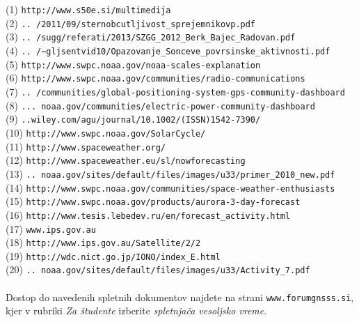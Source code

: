 (1)   \verb|http://www.s50e.si/multimedija| \\
(2)   \verb|.. /2011/09/sternobcutljivost_sprejemnikovp.pdf| \\
(3)   \verb|.. /sugg/referati/2013/SZGG_2012_Berk_Bajec_Radovan.pdf| \\
(4)   \verb|.. /~gljsentvid10/Opazovanje_Sonceve_povrsinske_aktivnosti.pdf| \\
(5)   \verb|http://www.swpc.noaa.gov/noaa-scales-explanation| \\   
(6)   \verb|http://www.swpc.noaa.gov/communities/radio-communications| \\   
(7)   \verb|.. /communities/global-positioning-system-gps-community-dashboard| \\   
(8)   \verb|... noaa.gov/communities/electric-power-community-dashboard|  \\ 
(9)   \verb|..wiley.com/agu/journal/10.1002/(ISSN)1542-7390/ |  \\   
(10)  \verb|http://www.swpc.noaa.gov/SolarCycle/|  \\   
(11)  \verb|http://www.spaceweather.org/|  \\   
(12)  \verb|http://www.spaceweather.eu/sl/nowforecasting|  \\   
(13)  \verb|.. noaa.gov/sites/default/files/images/u33/primer_2010_new.pdf|  \\   
(14)  \verb|http://www.swpc.noaa.gov/communities/space-weather-enthusiasts|  \\  
(15)  \verb|http://www.swpc.noaa.gov/products/aurora-3-day-forecast|  \\   
(16)  \verb|http://www.tesis.lebedev.ru/en/forecast_activity.html|  \\   
(17)  \verb|www.ips.gov.au|  \\   
(18)  \verb|http://www.ips.gov.au/Satellite/2/2|  \\   
(19)  \verb|http://wdc.nict.go.jp/IONO/index_E.html|  \\   
(20)  \verb|.. noaa.gov/sites/default/files/images/u33/Activity_7.pdf|

\paragraph*{ }
Dostop do navedenih spletnih dokumentov najdete na strani \verb|www.forumgnsss.si|, kjer v rubriki \textit{Za študente} izberite \textit{spletnjača vesoljsko vreme}.


%
%
